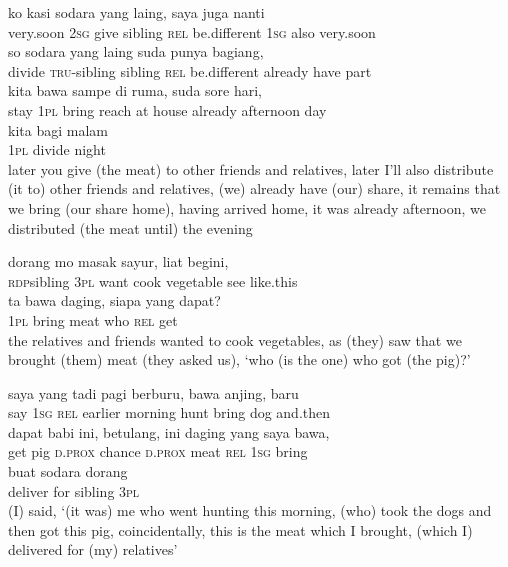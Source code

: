 \ea
{}    {ko}    {kasi}    {sodara}    {yang}    {laing,}    {saya}   juga    {nanti}\\
   {very.soon}    {\textsc{2sg}}    {give}    {sibling}    {\textsc{rel}}    {be.different}    {\textsc{1sg}}   also    {very.soon}\\
    {so}    {sodara}    {yang}    {laing}    {suda}    {punya}    {bagiang,}\\
   {divide}    {\textsc{tru}{}-sibling}    {sibling}    {\textsc{rel}}    {be.different}    {already}    {have}    {part}\\
    {kita}    {bawa}    {sampe}    {di}    {ruma,}    {suda}    {sore}   hari,\\
   {stay}    {\textsc{1pl}}    {bring}    {reach}    {at}    {house}    {already}    {afternoon}   day\\
\gll  kita    {bagi}    {malam}\\
  \textsc{1pl}    {divide}    {night}\\
\glt
later you give (the meat) to other friends and relatives, later I’ll also distribute (it to) other friends and relatives, (we) already have (our) share, it remains that we bring (our share home), having arrived home, it was already afternoon, we distributed (the meat until) the evening
\z

\ea
{}    {dorang}    {mo}    {masak}   sayur,   liat   begini,\\
   {\textsc{rdp}{\Tilde}sibling}    {\textsc{3pl}}    {want}    {cook}   vegetable   see   like.this\\
\gll ta   bawa    {daging,}    {siapa}    {yang}    {dapat?}\\
  \textsc{1pl}   bring    {meat}    {who}    {\textsc{rel}}    {get}\\
\glt
the relatives and friends wanted to cook vegetables, as (they) saw that we brought (them) meat (they asked us), ‘who (is the one) who got (the pig)?’
\z

\ea
{}    {saya}    {yang}    {tadi}    {pagi}    {berburu,}    {bawa}    {anjing,}   baru\\
   {say}    {\textsc{1sg}}    {\textsc{rel}}    {earlier}    {morning}    {hunt}    {bring}    {dog}   and.then\\
\gll dapat    {babi}    {ini,}    {betulang,}    {ini}    {daging}    {yang}   saya   bawa,\\
  get    {pig}    {\textsc{d.prox}}    {chance}    {\textsc{d.prox}}    {meat}    {\textsc{rel}}   \textsc{1sg}   bring\\
    {buat}    {sodara}    {dorang}\\
   {deliver}    {for}    {sibling}    {\textsc{3pl}}\\
\glt
(I) said, ‘(it was) me who went hunting this morning, (who) took the dogs and then got this pig, coincidentally, this is the meat which I brought, (which I) delivered for (my) relatives’
\z

